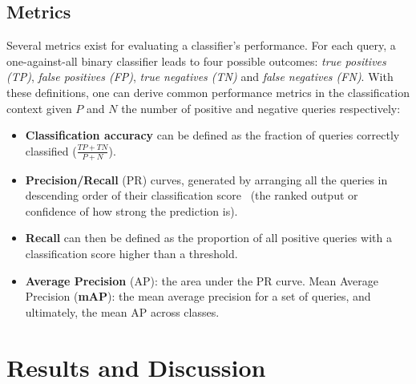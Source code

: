 \subsection{Metrics}
Several metrics exist for evaluating a classifier's performance. For each query, a one-against-all binary classifier leads to four possible outcomes: \emph{true positives (TP)}, \emph{false positives (FP)}, \emph{true negatives (TN)} and \emph{false negatives (FN)}. With these definitions, one can derive common performance metrics in the classification context given $P$ and $N$ the number of positive and negative queries respectively: 

\begin{itemize}

\item \textbf{Classification accuracy} can be defined as the fraction of queries correctly classified ($\frac{TP+TN}{P+N}$). 

\item \textbf{Precision/Recall} (PR) curves, generated by arranging all the queries in descending order of their classification score~\cite{Everingham2009} (\ie the ranked output or confidence of how strong the prediction is). 

\item \textbf{Recall} can then be defined as the proportion of all positive queries with a classification score higher than a threshold. 

\item \textbf{Average Precision} (AP): the area under the PR curve. Mean Average Precision (\textbf{mAP}): the mean average precision for a set of queries, and ultimately, the mean AP across classes.

\end{itemize}


\section{Results and Discussion} \label{sec:analysis} \label{sec:results}


